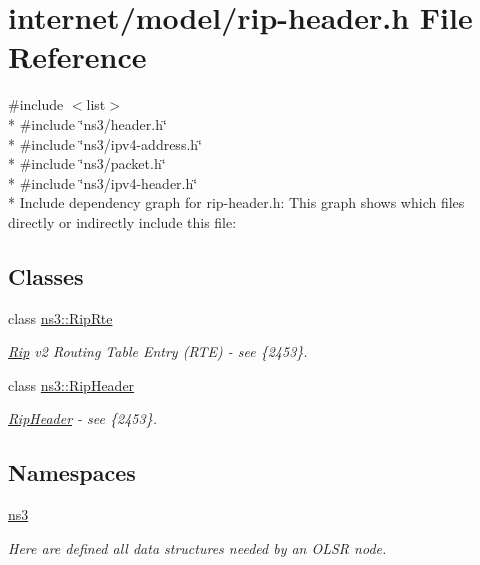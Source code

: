 \hypertarget{rip-header_8h}{}\section{internet/model/rip-\/header.h File Reference}
\label{rip-header_8h}
{\ttfamily \#include $<$list$>$}\\*
{\ttfamily \#include \char`\"{}ns3/header.\+h\char`\"{}}\\*
{\ttfamily \#include \char`\"{}ns3/ipv4-\/address.\+h\char`\"{}}\\*
{\ttfamily \#include \char`\"{}ns3/packet.\+h\char`\"{}}\\*
{\ttfamily \#include \char`\"{}ns3/ipv4-\/header.\+h\char`\"{}}\\*
Include dependency graph for rip-\/header.h\+:
This graph shows which files directly or indirectly include this file\+:
\subsection*{Classes}
\begin{DoxyCompactItemize}
\item 
class \hyperlink{classns3_1_1RipRte}{ns3\+::\+Rip\+Rte}
\begin{DoxyCompactList}\small\item\em \hyperlink{classns3_1_1Rip}{Rip} v2 Routing Table Entry (R\+TE) -\/ see \{2453\}. \end{DoxyCompactList}\item 
class \hyperlink{classns3_1_1RipHeader}{ns3\+::\+Rip\+Header}
\begin{DoxyCompactList}\small\item\em \hyperlink{classns3_1_1RipHeader}{Rip\+Header} -\/ see \{2453\}. \end{DoxyCompactList}\end{DoxyCompactItemize}
\subsection*{Namespaces}
\begin{DoxyCompactItemize}
\item 
 \hyperlink{namespacens3}{ns3}
\begin{DoxyCompactList}\small\item\em Here are defined all data structures needed by an O\+L\+SR node. \end{DoxyCompactList}\end{DoxyCompactItemize}
